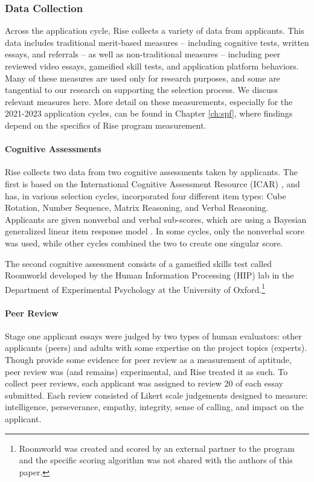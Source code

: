 \subsubsection{Data Collection}
Across the application cycle, Rise collects a variety of data from applicants. This data includes traditional merit-based measures – including cognitive tests, written essays, and referrals – as well as non-traditional measures – including peer reviewed video essays, gameified skill tests, and application platform behaviors. Many of these measures are used only for research purposes, and some are tangential to our research on supporting the selection process. We discuss relevant measures here. More detail on these measurements, especially for the 2021-2023 application cycles, can be found in Chapter \ref{ch:spf}, where findings depend on the specifics of Rise program measurement.

\paragraph{Cognitive Assessments}
Rise collects two data from two cognitive assessments taken by applicants. The first is based on the International Cognitive Assessment Resource (ICAR) \cite{condon2014international, subotic2020psychometric}, and has, in various selection cycles, incorporated four different item types: Cube Rotation, Number Sequence, Matrix Reasoning, and Verbal Reasoning. Applicants are given nonverbal and verbal sub-scores, which are using a Bayesian generalized linear item response model \cite{burkner2021bayesian}. In some cycles, only the nonverbal score was used, while other cycles combined the two to create one singular score.

The second cognitive assessment consists of a gameified skills test called Roomworld developed by the Human Information Processing (HIP) lab in the Department of Experimental Psychology at the University of Oxford.\footnote{Roomworld was created and scored by an external partner to the program and the specific scoring algorithm was not shared with the authors of this paper.}

\paragraph{Peer Review}
Stage one applicant essays were judged by two types of human evaluators: other applicants (peers) and adults with some expertise on the project topics (experts). Though \textcite{citation needed} provide some evidence for peer review as a measurement of aptitude, peer review was (and remains) experimental, and Rise treated it as such. To collect peer reviews, each applicant was assigned to review 20 of each essay submitted. Each review consisted of Likert scale judgements designed to measure: intelligence, perseverance, empathy, integrity, sense of calling, and impact on the applicant.

